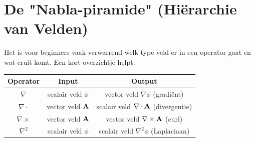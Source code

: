 \documentclass[11pt,a4paper]{article}
\begin{document}
    \section{De "Nabla-piramide" (Hiërarchie van Velden)}
    Het is voor beginners vaak verwarrend welk type veld er in een operator gaat en wat eruit komt. Een kort overzichtje helpt:
    \begin{center}
        \begin{tabular}{c|c|c}
            Operator         & Input                  & Output                                           \\
            \hline
            \(\nabla\)       & scalair veld \(\phi\)  & vector veld \(\nabla\phi\) (gradi\"ent)          \\
            \(\nabla\cdot\)  & vector veld \(\vb{A}\) & scalair veld \(\nabla\cdot\vb{A}\) (divergentie) \\
            \(\nabla\times\) & vector veld \(\vb{A}\) & vector veld \(\nabla\times\vb{A}\) (curl)        \\
            \(\nabla^2\)     & scalair veld \(\phi\)  & scalair veld \(\nabla^2\phi\) (Laplaciaan)
        \end{tabular}
    \end{center}
\end{document}
